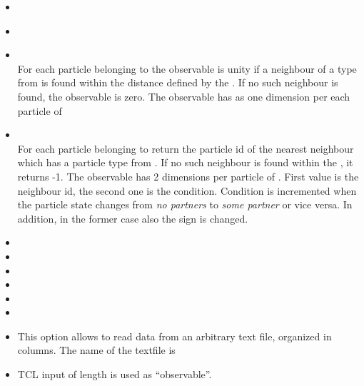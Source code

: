\begin{itemize}
    \item {} \\
    \item {} \\
    \item {}    \\
          For each particle belonging to  
          the observable is unity if a neighbour of a type from 
           is found within the distance 
          defined by the . If no such neighbour is found, the 
          observable is zero. The observable has as one dimension per each 
          particle of 
    \item {} \\
          For each particle belonging to  return the particle id
	  of the nearest neighbour which has a particle type from . 
	  If no such neighbour is found within the , it returns -1. 
	  The observable has 2 dimensions per particle of . First
	  value is the neighbour id, the second one is the condition. Condition is
	  incremented when the particle state changes from \emph{no partners}
	  to \emph{some partner} or vice versa. In addition, in the former case
	  also the sign is changed.
          
    \item {}
    \item {}
    \item {}
    \item {}
    \item {}
    \item {}
    \item {}
      This option allows to read data from an arbitrary text file, organized in columns.
      The name of the textfile is 
    \item {} TCL input of length   is used as ``observable''. 
  \end{itemize}

